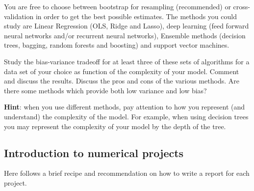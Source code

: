 \documentclass[%
oneside,                 %
final,                   %
10pt]{article}
\begin{document}
You
are free to choose between bootstrap for resampling (recommended) or
cross-validation in order to get the best possible estimates. The
methods you could study are Linear Regression (OLS, Ridge and Lasso),
deep learning (feed forward neural networks and/or recurrent neural
networks), Ensemble methods (decision trees, bagging, random forests
and boosting) and support vector machines.

Study the bias-variance tradeoff for at least three of these sets of
algorithms for a data set of your choice as function of the complexity
of your model.  Comment and discuss the results. Discuss the pros and
cons of the various methods. Are there some methods which provide both
low variance and low bias?

\textbf{Hint}: when you use different methods, pay attention to how you represent (and understand) the complexity of the model. For example, when using  decision trees you may  represent the complexity of your model  by the depth of the tree. 

\subsection*{Introduction to numerical projects}

Here follows a brief recipe and recommendation on how to write a report for each
project.
\end{document}
